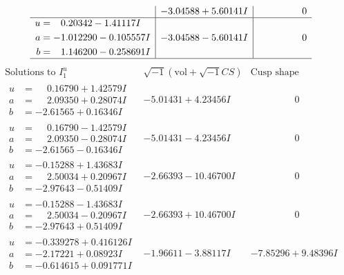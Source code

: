 \documentclass[1p]{elsarticle_modified}
\theoremstyle{definition}
\newcommand{\I}{\sqrt{-1}}
\begin{document}
$$\begin{array}{c|c|c}
 & -3.04588 + 5.60141 I & \phantom{-0.000000 } 0 \\ \hline\begin{aligned}
u &= \phantom{-}0.20342 - 1.41117 I \\
a &= -1.012290 - 0.105557 I \\
b &= \phantom{-}1.146200 - 0.258691 I\end{aligned}
 & -3.04588 - 5.60141 I & \phantom{-0.000000 } 0\\
 \hline 
 \end{array}$$\newpage$$\begin{array}{c|c|c}  
\text{Solutions to }I^u_{1}& \I (\text{vol} + \sqrt{-1}CS) & \text{Cusp shape}\\
 \hline 
\begin{aligned}
u &= \phantom{-}0.16790 + 1.42579 I \\
a &= \phantom{-}2.09350 + 0.28074 I \\
b &= -2.61565 + 0.16346 I\end{aligned}
 & -5.01431 + 4.23456 I & \phantom{-0.000000 } 0 \\ \hline\begin{aligned}
u &= \phantom{-}0.16790 - 1.42579 I \\
a &= \phantom{-}2.09350 - 0.28074 I \\
b &= -2.61565 - 0.16346 I\end{aligned}
 & -5.01431 - 4.23456 I & \phantom{-0.000000 } 0 \\ \hline\begin{aligned}
u &= -0.15288 + 1.43683 I \\
a &= \phantom{-}2.50034 + 0.20967 I \\
b &= -2.97643 - 0.51409 I\end{aligned}
 & -2.66393 - 10.46700 I & \phantom{-0.000000 } 0 \\ \hline\begin{aligned}
u &= -0.15288 - 1.43683 I \\
a &= \phantom{-}2.50034 - 0.20967 I \\
b &= -2.97643 + 0.51409 I\end{aligned}
 & -2.66393 + 10.46700 I & \phantom{-0.000000 } 0 \\ \hline\begin{aligned}
u &= -0.339278 + 0.416126 I \\
a &= -2.17221 + 0.08923 I \\
b &= -0.614615 + 0.091771 I\end{aligned}
 & -1.96611 - 3.88117 I & -7.85296 + 9.48396 I \\ \hline\begin{aligned}

\end{aligned}
\end{array}$$
\end{document}
